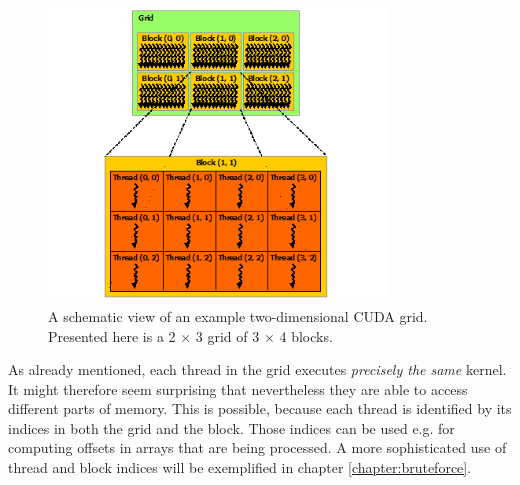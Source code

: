 \begin{figure}[ht]
    \centering
    \includegraphics[width=0.8\textwidth]{figures/grid-of-thread-blocks.png}
    \caption{{\protect {}} A schematic view of an example two-dimensional CUDA grid. Presented here is a 2 $\times$ 3 grid of 3 $\times$ 4 blocks.}
    \label{fig:cuda_grid}
\end{figure}

As already mentioned, each thread in the grid executes \emph{precisely the same} kernel. It might therefore seem surprising that nevertheless they are able to access different parts of memory. This is possible, because each thread is identified by its indices in both the grid and the block. Those indices can be used e.g. for computing offsets in arrays that are being processed. A more sophisticated use of thread and block indices will be exemplified in chapter \ref{chapter:bruteforce}.

